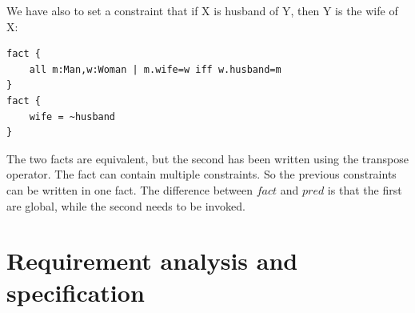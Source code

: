 \documentclass[12pt, a4paper]{report}
\begin{document}
        We have also to set a constraint that if X is husband of Y, then Y is the wife of X:
\begin{lstlisting}[language=alloy]
fact {
    all m:Man,w:Woman | m.wife=w iff w.husband=m
}
fact {
    wife = ~husband
}
\end{lstlisting}
        The two facts are equivalent, but the second has been written using the transpose operator. The fact can contain multiple constraints. So the previous constraints 
        can be written in one fact. The difference between $fact$ and $pred$ is that the first are global, while the second needs to be invoked.
        
    \newpage

    \chapter{Requirement analysis and specification}
\end{document}
